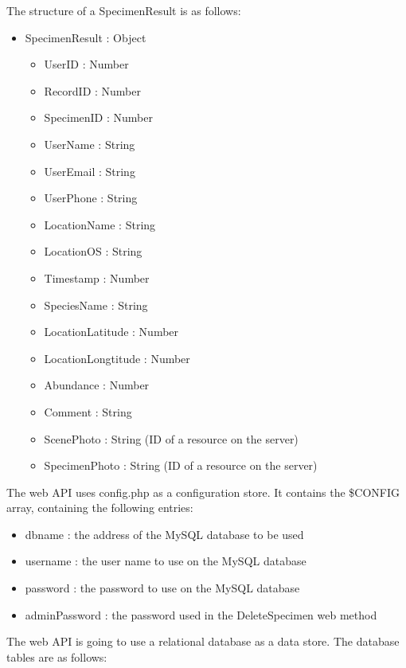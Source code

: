         The structure of a SpecimenResult is as follows:
        \begin{itemize}
            \item SpecimenResult : Object
            \begin{itemize}
                \item UserID : Number
                \item RecordID : Number
                \item SpecimenID : Number
                \item UserName : String
                \item UserEmail : String
                \item UserPhone : String
                \item LocationName : String
                \item LocationOS : String
                \item Timestamp : Number
                \item SpeciesName : String
                \item LocationLatitude : Number
                \item LocationLongtitude : Number
                \item Abundance : Number
                \item Comment : String
                \item ScenePhoto : String (ID of a resource on the server)
                \item SpecimenPhoto : String (ID of a resource on the server)
            \end{itemize}
        \end{itemize}

        The web API uses config.php as a configuration store. It contains the \$CONFIG array, containing the following entries:
        
         \begin{itemize}
                \item dbname : the address of the MySQL database to be used
                \item username : the user name to use on the MySQL database
                \item password : the password to use on the MySQL database
                \item adminPassword : the password used in the DeleteSpecimen web method
        \end{itemize}
        The web API is going to use a relational database as a data store.
        The database tables are as follows:

